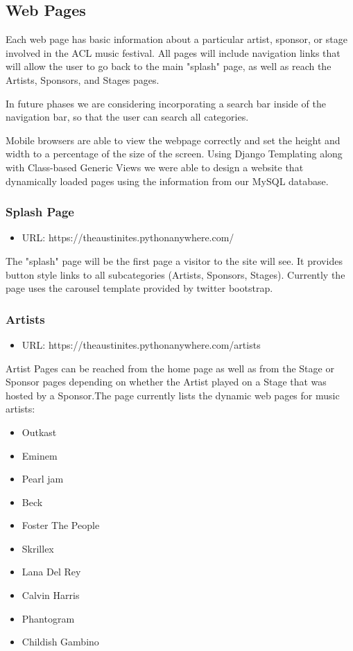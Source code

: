 \documentclass[12pt,english]{scrartcl}
\begin{document}
\subsection{Web Pages}
Each web page has basic information about a particular artist, sponsor, or stage involved in the ACL music festival.
All pages will include  navigation links that will allow the user to go back to the main "splash" page, as well as reach the Artists, Sponsors, and
Stages pages. 

In future phases we are considering incorporating a search bar inside of the navigation bar, so that the user can search
all categories.

Mobile browsers are able to view the webpage correctly and set the height and width to a percentage of the size of the screen.
Using Django Templating along with Class-based Generic Views we were able to design a website that dynamically loaded pages using the information from our MySQL database.


\subsubsection{Splash Page}
\begin{itemize}
 \item URL: https://theaustinites.pythonanywhere.com/
\end{itemize}

The "splash" page will be the first page a visitor to the site will see. It provides button style links to all subcategories (Artists,
Sponsors, Stages). Currently the page uses the carousel template provided by twitter bootstrap.

\subsubsection{Artists}

\begin{itemize}
 \item URL: https://theaustinites.pythonanywhere.com/artists
\end{itemize}

Artist Pages can be reached from the home page as well as from the Stage or Sponsor pages depending on whether the Artist played on
a Stage that was hosted by a Sponsor.The page currently lists the dynamic web pages for music artists:
\begin{itemize}
 \item Outkast
 \item Eminem
 \item Pearl jam
 \item Beck
 \item Foster The People
 \item Skrillex
 \item Lana Del Rey
 \item Calvin Harris
 \item Phantogram
 \item Childish Gambino
\end{itemize}
\end{document}
